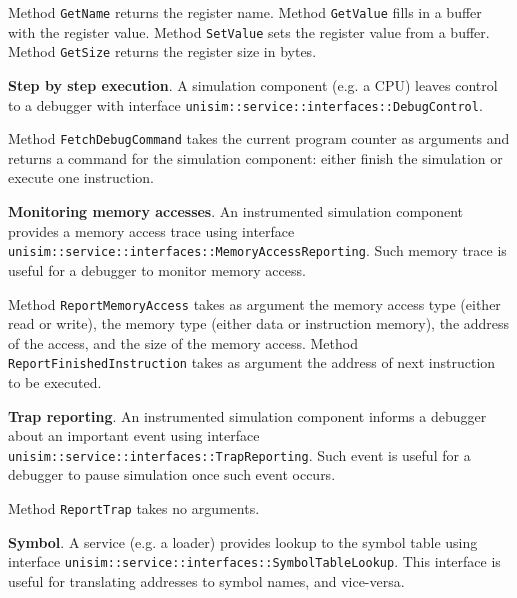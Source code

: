 \begin{center}
	
\end{center}

\noindent Method \texttt{GetName} returns the register name.
\noindent Method \texttt{GetValue} fills in a buffer with the register value.
\noindent Method \texttt{SetValue} sets the register value from a buffer.
\noindent Method \texttt{GetSize} returns the register size in bytes.

\textbf{Step by step execution}. A simulation component (e.g. a CPU) leaves control to a debugger with interface \texttt{unisim::service::interfaces::DebugControl}.

\begin{center}
	
\end{center}

Method \texttt{FetchDebugCommand} takes the current program counter as arguments and returns a command for the simulation component: either finish the simulation or execute one instruction.

\textbf{Monitoring memory accesses}. An instrumented simulation component provides a memory access trace using interface \texttt{unisim::service::interfaces::MemoryAccessReporting}.
Such memory trace is useful for a debugger to monitor memory access.

\begin{center}
	
\end{center}

Method \texttt{ReportMemoryAccess} takes as argument the memory access type (either read or write), the memory type (either data or instruction memory), the address of the access, and the size of the memory access.
Method \texttt{ReportFinishedInstruction} takes as argument the address of next instruction to be executed.

\textbf{Trap reporting}. An instrumented simulation component informs a debugger about an important event using interface \texttt{unisim::service::interfaces::TrapReporting}.
Such event is useful for a debugger to pause simulation once such event occurs.

\begin{center}
	
\end{center}

Method \texttt{ReportTrap} takes no arguments.

\textbf{Symbol}. A service (e.g. a loader) provides lookup to the symbol table using interface \texttt{unisim::service::interfaces::SymbolTableLookup}.
This interface is useful for translating addresses to symbol names, and vice-versa.

